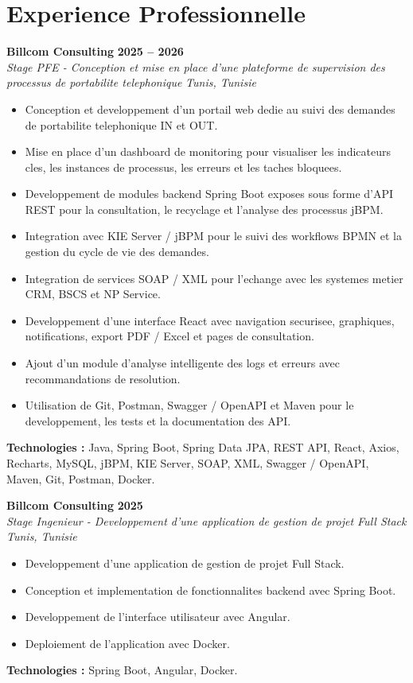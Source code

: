 \documentclass[10pt,a4paper]{article}
\newcommand{\entry}[4]{
    \textbf{#1} \hfill \textbf{#2}\\
    \textit{#3} \hfill \textit{#4}\\
}
\begin{document}
\section*{Experience Professionnelle}
\entry{Billcom Consulting}{2025 -- 2026}
{Stage PFE - Conception et mise en place d'une plateforme de supervision des processus de portabilite telephonique}{Tunis, Tunisie}
\begin{itemize}
    \item Conception et developpement d'un portail web dedie au suivi des demandes de portabilite telephonique IN et OUT.
    \item Mise en place d'un dashboard de monitoring pour visualiser les indicateurs cles, les instances de processus, les erreurs et les taches bloquees.
    \item Developpement de modules backend Spring Boot exposes sous forme d'API REST pour la consultation, le recyclage et l'analyse des processus jBPM.
    \item Integration avec KIE Server / jBPM pour le suivi des workflows BPMN et la gestion du cycle de vie des demandes.
    \item Integration de services SOAP / XML pour l'echange avec les systemes metier CRM, BSCS et NP Service.
    \item Developpement d'une interface React avec navigation securisee, graphiques, notifications, export PDF / Excel et pages de consultation.
    \item Ajout d'un module d'analyse intelligente des logs et erreurs avec recommandations de resolution.
    \item Utilisation de Git, Postman, Swagger / OpenAPI et Maven pour le developpement, les tests et la documentation des API.
\end{itemize}
\textbf{Technologies :} Java, Spring Boot, Spring Data JPA, REST API, React, Axios, Recharts, MySQL, jBPM, KIE Server, SOAP, XML, Swagger / OpenAPI, Maven, Git, Postman, Docker.

\vspace{4pt}
\entry{Billcom Consulting}{2025}
{Stage Ingenieur - Developpement d'une application de gestion de projet Full Stack}{Tunis, Tunisie}
\begin{itemize}
    \item Developpement d'une application de gestion de projet Full Stack.
    \item Conception et implementation de fonctionnalites backend avec Spring Boot.
    \item Developpement de l'interface utilisateur avec Angular.
    \item Deploiement de l'application avec Docker.
\end{itemize}
\textbf{Technologies :} Spring Boot, Angular, Docker.
\end{document}
